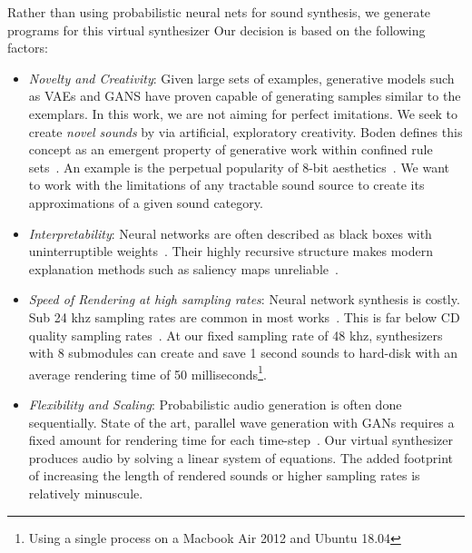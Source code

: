 \documentclass[runningheads,a4paper]{llncs}
\begin{document}
 Rather than using probabilistic neural nets for sound synthesis, we generate programs for this virtual synthesizer Our decision is based on the following factors:
\begin{itemize}
    \item \textit{Novelty and Creativity}: Given large sets of examples, generative models such as VAEs and GANS have proven capable of generating samples similar to the exemplars. In this work, we are not aiming for perfect imitations. We seek to create \emph{novel sounds} by via artificial, exploratory creativity. Boden defines this concept as an emergent property of generative work within confined rule sets~\cite{boden2009computer}. An example is the perpetual popularity of 8-bit aesthetics~\cite{collins2007loop}. We want to work with the limitations of any tractable sound source to create its approximations of a given sound category. 
    \item \textit{Interpretability}: Neural networks are often described as black boxes with uninterruptible weights~\cite{basheer2000artificial}. Their highly recursive structure makes modern explanation methods such as saliency maps unreliable~\cite{rudin2019stop}.  
    \item \textit{Speed of Rendering at high sampling rates}: Neural network synthesis is costly. Sub 24 khz sampling rates are common in most works~\cite{yamamoto2020parallel,oord2017parallel,aouameur2019neural,ramires2020neural}. This is far below CD quality sampling rates~\cite{reiss2016meta}. At our fixed sampling rate of 48 khz, synthesizers with 8 submodules can create and save 1 second sounds to hard-disk with an average rendering time of 50 milliseconds\footnote{Using a single process on a Macbook Air 2012 and Ubuntu 18.04}. 
    \item \textit{Flexibility and Scaling}: Probabilistic audio generation is often done sequentially. State of the art, parallel wave generation with GANs requires a fixed amount for rendering time for each time-step~\cite{yamamoto2020parallel}. Our virtual synthesizer produces audio by solving a linear system of equations. The added footprint of increasing the length of rendered sounds or higher sampling rates is relatively minuscule.  
\end{itemize}

 
\end{document}
